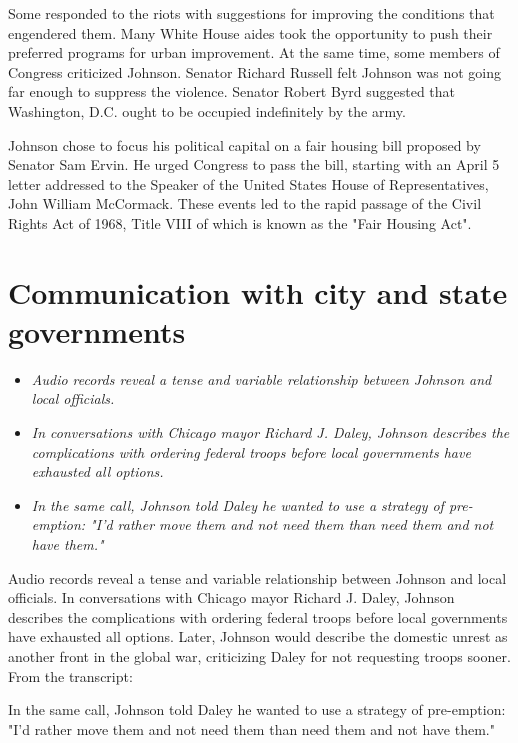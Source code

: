 Some responded to the riots with suggestions for improving the
conditions that engendered them. Many White House aides took the
opportunity to push their preferred programs for urban improvement. At
the same time, some members of Congress criticized Johnson. Senator
Richard Russell felt Johnson was not going far enough to suppress the
violence. Senator Robert Byrd suggested that Washington, D.C. ought to
be occupied indefinitely by the army.

Johnson chose to focus his political capital on a fair housing bill
proposed by Senator Sam Ervin. He urged Congress to pass the bill,
starting with an April 5 letter addressed to the Speaker of the United
States House of Representatives, John William McCormack. These events
led to the rapid passage of the Civil Rights Act of 1968, Title VIII of
which is known as the "Fair Housing Act".

\section{Communication with city and state
governments}\label{communication-with-city-and-state-governments}

\begin{itemize}
\item
  \emph{Audio records reveal a tense and variable relationship between
  Johnson and local officials.}
\item
  \emph{In conversations with Chicago mayor Richard J. Daley, Johnson
  describes the complications with ordering federal troops before local
  governments have exhausted all options.}
\item
  \emph{In the same call, Johnson told Daley he wanted to use a strategy
  of pre-emption: "I'd rather move them and not need them than need them
  and not have them."}
\end{itemize}

Audio records reveal a tense and variable relationship between Johnson
and local officials. In conversations with Chicago mayor Richard J.
Daley, Johnson describes the complications with ordering federal troops
before local governments have exhausted all options. Later, Johnson
would describe the domestic unrest as another front in the global war,
criticizing Daley for not requesting troops sooner. From the transcript:

In the same call, Johnson told Daley he wanted to use a strategy of
pre-emption: "I'd rather move them and not need them than need them and
not have them."


